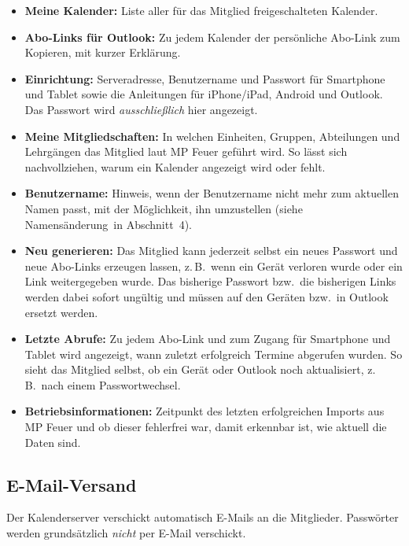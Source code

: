 \documentclass[a4paper,fontsize=10pt]{scrartcl}
\begin{document}
\begin{itemize}
  \item \textbf{Meine Kalender:} Liste aller für das Mitglied freigeschalteten
        Kalender.
  \item \textbf{Abo-Links für Outlook:} Zu jedem Kalender der persönliche
        Abo-Link zum Kopieren, mit kurzer Erklärung.
  \item \textbf{Einrichtung:} Serveradresse, Benutzername und Passwort für
        Smartphone und Tablet sowie die Anleitungen für iPhone/iPad, Android
        und Outlook. Das Passwort wird \emph{ausschließlich} hier angezeigt.
  \item \textbf{Meine Mitgliedschaften:} In welchen Einheiten, Gruppen,
        Abteilungen und Lehrgängen das Mitglied laut MP Feuer geführt wird.
        So lässt sich nachvollziehen, warum ein Kalender angezeigt wird oder
        fehlt.
  \item \textbf{Benutzername:} Hinweis, wenn der Benutzername nicht mehr
        zum aktuellen Namen passt, mit der Möglichkeit, ihn umzustellen
        (siehe \glqq Namensänderung\grqq\ in Abschnitt~4).
  \item \textbf{Neu generieren:} Das Mitglied kann jederzeit selbst ein
        neues Passwort und neue Abo-Links erzeugen lassen, z.\,B.\ wenn ein
        Gerät verloren wurde oder ein Link weitergegeben wurde. Das bisherige
        Passwort bzw.\ die bisherigen Links werden dabei sofort ungültig und
        müssen auf den Geräten bzw.\ in Outlook ersetzt werden.
  \item \textbf{Letzte Abrufe:} Zu jedem Abo-Link und zum Zugang für
        Smartphone und Tablet wird angezeigt, wann zuletzt erfolgreich
        Termine abgerufen wurden. So sieht das Mitglied selbst, ob ein Gerät
        oder Outlook noch aktualisiert, z.\,B.\ nach einem Passwortwechsel.
  \item \textbf{Betriebsinformationen:} Zeitpunkt des letzten erfolgreichen
        Imports aus MP Feuer und ob dieser fehlerfrei war, damit erkennbar
        ist, wie aktuell die Daten sind.
\end{itemize}

\subsection*{E-Mail-Versand}

Der Kalenderserver verschickt automatisch E-Mails an die Mitglieder.
Passwörter werden grundsätzlich \emph{nicht} per E-Mail verschickt.
\end{document}

